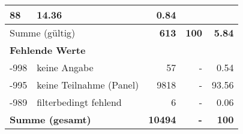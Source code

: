 \begin{longtable}{lXrrr}
       \num{88} &
       \num[round-mode=places,round-precision=2]{14,36} &
         \num[round-mode=places,round-precision=2]{0,84} \\
     \midrule
     \multicolumn{2}{l}{Summe (gültig)} &
       \textbf{\num{613}} &
     \textbf{100} &
       \textbf{\num[round-mode=places,round-precision=2]{5,84}} \\
     \multicolumn{5}{l}{\textbf{Fehlende Werte}}\\
       -998 &
       keine Angabe &
         \num{57} &
        - &
         \num[round-mode=places,round-precision=2]{0,54} \\
       -995 &
       keine Teilnahme (Panel) &
         \num{9818} &
        - &
         \num[round-mode=places,round-precision=2]{93,56} \\
       -989 &
       filterbedingt fehlend &
         \num{6} &
        - &
         \num[round-mode=places,round-precision=2]{0,06} \\
     \midrule
     \multicolumn{2}{l}{\textbf{Summe (gesamt)}} &
          \textbf{\num{10494}} &
        \textbf{-} &
        \textbf{100} \\
     \bottomrule
     \end{longtable}
     
